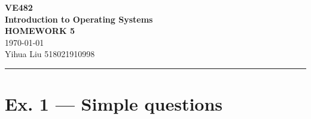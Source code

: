 \documentclass[a4paper]{article}
\begin{document}
\begin{center}
    \huge
    \textbf{VE482\\Introduction to Operating Systems\\}
    \Large
    \vspace{15pt}
    \uppercase{\textbf{Homework 5}}\\
    \large
    \vspace{5pt}\today\\
    \vspace{5pt}
    Yihua Liu 518021910998
    \vspace{5pt}
    \rule[-5pt]{.97\linewidth}{0.05em}
\end{center}
\section*{Ex. 1 — Simple questions}
\end{document}
